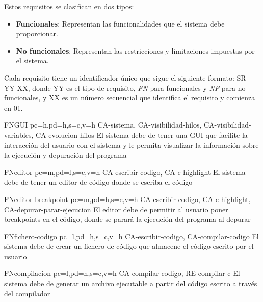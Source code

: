 Estos requisitos se clasifican en dos tipos:
\begin{itemize}
    \item \textbf{Funcionales}: Representan las funcionalidades que el sistema debe proporcionar.
    \item \textbf{No funcionales}: Representan las restricciones y limitaciones impuestas por el sistema.
\end{itemize}

Cada requisito tiene un identificador único que sigue el siguiente formato: SR-YY-XX, donde YY es el tipo de requisito, \textit{FN} para funcionales y \textit{NF} para no funcionales, y XX es un número secuencial que identifica el requisito y comienza en 01.

\printsreqtemplate

\begin{softwareReq}{FN}{GUI}
    {pc=h,pd=h,s=c,v=h}
    {CA-sistema, CA-visibilidad-hilos, CA-visibilidad-variables, CA-evolucion-hilos}
    El sistema debe de tener una \gls{GUI} que facilite la interacción del usuario con el sistema y le permita visualizar la información sobre la ejecución y depuración del programa
\end{softwareReq}

\begin{softwareReq}{FN}{editor}
    {pc=m,pd=l,s=c,v=h}
    {CA-escribir-codigo, CA-c-highlight}
    El sistema debe de tener un editor de código donde se escriba el código
\end{softwareReq}

\begin{softwareReq}{FN}{editor-breakpoint}
    {pc=m,pd=h,s=c,v=h}
    {CA-escribir-codigo, CA-c-highlight, CA-depurar-parar-ejecucion}
    El editor debe de permitir al usuario poner breakpoints en el código, donde se parará la ejecución del programa al depurar
\end{softwareReq}

\begin{softwareReq}{FN}{fichero-codigo}
    {pc=l,pd=h,s=c,v=h}
    {CA-escribir-codigo, CA-compilar-codigo}
    El sistema debe de crear un fichero de código que almacene el código escrito por el usuario
\end{softwareReq}

\begin{softwareReq}{FN}{compilacion}
    {pc=l,pd=h,s=c,v=h}
    {CA-compilar-codigo, RE-compilar-c}
    El sistema debe de generar un archivo ejecutable a partir del código escrito a través del compilador
\end{softwareReq}

